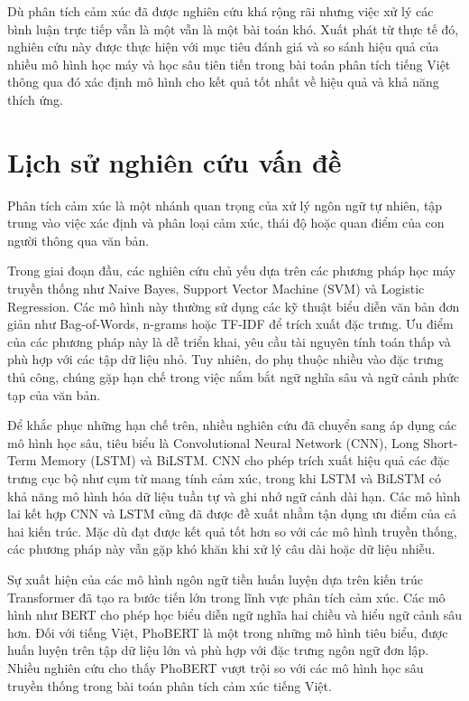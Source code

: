 \documentclass[14pt, a4paper]{report}
\begin{document}
Dù phân tích cảm xúc đã được nghiên cứu khá rộng rãi nhưng việc xử lý các bình luận trực tiếp vẫn là một vẫn là một bài toán khó. Xuất phát từ thực tế đó, nghiên cứu này được thực hiện với mục tiêu đánh giá và so sánh hiệu quả của nhiều mô hình học máy và học sâu tiên tiến trong bài toán phân tích tiếng Việt thông qua đó xác định mô hình cho kết quả tốt nhất về hiệu quả và khả năng thích ứng.

\section{Lịch sử nghiên cứu vấn đề}

Phân tích cảm xúc là một nhánh quan trọng của xử lý ngôn ngữ tự nhiên, tập trung vào việc xác định và phân loại cảm xúc, thái độ hoặc quan điểm của con người thông qua văn bản.

Trong giai đoạn đầu, các nghiên cứu chủ yếu dựa trên các phương pháp học máy truyền thống như Naive Bayes, Support Vector Machine (SVM) và Logistic Regression. Các mô hình này thường sử dụng các kỹ thuật biểu diễn văn bản đơn giản như Bag-of-Words, n-grams hoặc TF-IDF để trích xuất đặc trưng. Ưu điểm của các phương pháp này là dễ triển khai, yêu cầu tài nguyên tính toán thấp và phù hợp với các tập dữ liệu nhỏ. Tuy nhiên, do phụ thuộc nhiều vào đặc trưng thủ công, chúng gặp hạn chế trong việc nắm bắt ngữ nghĩa sâu và ngữ cảnh phức tạp của văn bản.

Để khắc phục những hạn chế trên, nhiều nghiên cứu đã chuyển sang áp dụng các mô hình học sâu, tiêu biểu là Convolutional Neural Network (CNN), Long Short-Term Memory (LSTM) và BiLSTM. CNN cho phép trích xuất hiệu quả các đặc trưng cục bộ như cụm từ mang tính cảm xúc, trong khi LSTM và BiLSTM có khả năng mô hình hóa dữ liệu tuần tự và ghi nhớ ngữ cảnh dài hạn. Các mô hình lai kết hợp CNN và LSTM cũng đã được đề xuất nhằm tận dụng ưu điểm của cả hai kiến trúc. Mặc dù đạt được kết quả tốt hơn so với các mô hình truyền thống, các phương pháp này vẫn gặp khó khăn khi xử lý câu dài hoặc dữ liệu nhiễu.

Sự xuất hiện của các mô hình ngôn ngữ tiền huấn luyện dựa trên kiến trúc Transformer đã tạo ra bước tiến lớn trong lĩnh vực phân tích cảm xúc. Các mô hình như BERT cho phép học biểu diễn ngữ nghĩa hai chiều và hiểu ngữ cảnh sâu hơn. Đối với tiếng Việt, PhoBERT là một trong những mô hình tiêu biểu, được huấn luyện trên tập dữ liệu lớn và phù hợp với đặc trưng ngôn ngữ đơn lập. Nhiều nghiên cứu cho thấy PhoBERT vượt trội so với các mô hình học sâu truyền thống trong bài toán phân tích cảm xúc tiếng Việt.
\end{document}
